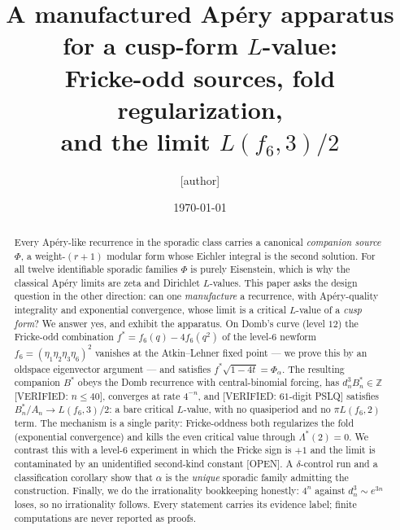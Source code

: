 \documentclass[11pt,reqno]{amsart}
\theoremstyle{plain}
\theoremstyle{definition}
\theoremstyle{remark}
\newcommand{\Z}{\mathbb{Z}}
\newcommand{\fs}{f^{*}}
\newcommand{\VerifiedR}[1]{\textup{\textsf{[VERIFIED: #1]}}}
\newcommand{\Open}{\textup{\textsf{[OPEN]}}}
\begin{document}
\title[A manufactured Ap\'ery apparatus for a cusp-form $L$-value]
      {A manufactured Ap\'ery apparatus\\ for a cusp-form $L$-value:\\
       Fricke-odd sources, fold regularization,\\ and the limit
       $L(f_6,3)/2$}

\author{[author]}
\date{\today}

\begin{abstract}
Every Ap\'ery-like recurrence in the sporadic class carries a canonical
\emph{companion source} $\Phi$, a weight-$(r{+}1)$ modular form whose
Eichler integral is the second solution. For all twelve identifiable
sporadic families $\Phi$ is purely Eisenstein, which is why the classical
Ap\'ery limits are zeta and Dirichlet $L$-values. This paper asks the
design question in the other direction: can one \emph{manufacture} a
recurrence, with Ap\'ery-quality integrality and exponential convergence,
whose limit is a critical $L$-value of a \emph{cusp form}? We answer yes,
and exhibit the apparatus. On Domb's curve (level $12$) the Fricke-odd
combination $\fs=f_6(q)-4f_6(q^2)$ of the level-$6$ newform
$f_6=(\eta_1\eta_2\eta_3\eta_6)^2$ vanishes at the Atkin--Lehner fixed
point --- we prove this by an oldspace eigenvector argument --- and
satisfies $\fs\sqrt{1-4t}=\Phi_\alpha$. The resulting companion $B^*$
obeys the Domb recurrence with central-binomial forcing, has
$d_n^3B^*_n\in\Z$ \VerifiedR{$n\le40$}, converges at rate $4^{-n}$, and
\VerifiedR{$61$-digit PSLQ} satisfies $B^*_n/A_n\to L(f_6,3)/2$: a bare
critical $L$-value, with no quasiperiod and no $\pi L(f_6,2)$ term.
The mechanism is a single parity: Fricke-oddness both regularizes the
fold (exponential convergence) and kills the even critical value through
$\Lambda^*(2)=0$. We contrast this with a level-$6$ experiment in which
the Fricke sign is $+1$ and the limit is contaminated by an
unidentified second-kind constant \Open. A $\delta$-control run and a
classification corollary show that $\alpha$ is the \emph{unique}
sporadic family admitting the construction. Finally, we do the
irrationality bookkeeping honestly: $4^n$ against $d_n^3\sim e^{3n}$
loses, so no irrationality follows. Every statement carries its evidence
label; finite computations are never reported as proofs.
\end{abstract}

\maketitle
\setcounter{tocdepth}{1}
\tableofcontents
\end{document}
